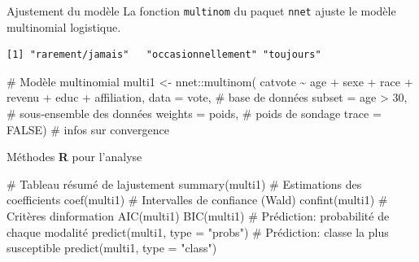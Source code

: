 \documentclass[
  ignorenonframetext,
]{beamer}
\newenvironment{Shaded}{\begin{snugshade}}{\end{snugshade}}
\newcommand{\AttributeTok}[1]{\textcolor[rgb]{0.40,0.45,0.13}{#1}}
\newcommand{\CommentTok}[1]{\textcolor[rgb]{0.37,0.37,0.37}{#1}}
\newcommand{\ConstantTok}[1]{\textcolor[rgb]{0.56,0.35,0.01}{#1}}
\newcommand{\DecValTok}[1]{\textcolor[rgb]{0.68,0.00,0.00}{#1}}
\newcommand{\FunctionTok}[1]{\textcolor[rgb]{0.28,0.35,0.67}{#1}}
\newcommand{\NormalTok}[1]{\textcolor[rgb]{0.00,0.23,0.31}{#1}}
\newcommand{\OtherTok}[1]{\textcolor[rgb]{0.00,0.23,0.31}{#1}}
\newcommand{\SpecialCharTok}[1]{\textcolor[rgb]{0.37,0.37,0.37}{#1}}
\newcommand{\StringTok}[1]{\textcolor[rgb]{0.13,0.47,0.30}{#1}}
\begin{document}
\begin{frame}[fragile]{Ajustement du modèle}
\protect\hypertarget{ajustement-du-moduxe8le}{}
La fonction \texttt{multinom} du paquet \texttt{nnet} ajuste le modèle
multinomial logistique.

\begin{Shaded}
\end{Shaded}

\begin{verbatim}
[1] "rarement/jamais"   "occasionnellement" "toujours"         
\end{verbatim}

\begin{Shaded}
\begin{Highlighting}[numbers=left,,]
\CommentTok{\# Modèle multinomial}
\NormalTok{multi1 }\OtherTok{\textless{}{-}}\NormalTok{ nnet}\SpecialCharTok{::}\FunctionTok{multinom}\NormalTok{(}
\NormalTok{  catvote }\SpecialCharTok{\textasciitilde{}}\NormalTok{ age }\SpecialCharTok{+}\NormalTok{ sexe }\SpecialCharTok{+}\NormalTok{ race }\SpecialCharTok{+}\NormalTok{ revenu }\SpecialCharTok{+} 
\NormalTok{    educ }\SpecialCharTok{+}\NormalTok{ affiliation, }
  \AttributeTok{data =}\NormalTok{ vote,       }\CommentTok{\# base de données}
  \AttributeTok{subset =}\NormalTok{ age }\SpecialCharTok{\textgreater{}} \DecValTok{30}\NormalTok{, }\CommentTok{\# sous{-}ensemble des données}
  \AttributeTok{weights =}\NormalTok{ poids,   }\CommentTok{\# poids de sondage}
  \AttributeTok{trace =} \ConstantTok{FALSE}\NormalTok{)     }\CommentTok{\# infos sur convergence}
\end{Highlighting}
\end{Shaded}
\end{frame}

\begin{frame}[fragile]{Méthodes \textbf{R} pour l'analyse}
\protect\hypertarget{muxe9thodes-r-pour-lanalyse}{}
\begin{Shaded}
\begin{Highlighting}[numbers=left,,]
\CommentTok{\# Tableau résumé de l\textquotesingle{}ajustement}
\FunctionTok{summary}\NormalTok{(multi1)}
\CommentTok{\# Estimations des coefficients}
\FunctionTok{coef}\NormalTok{(multi1)}
\CommentTok{\# Intervalles de confiance (Wald)}
\FunctionTok{confint}\NormalTok{(multi1)}
\CommentTok{\# Critères d\textquotesingle{}information}
\FunctionTok{AIC}\NormalTok{(multi1)}
\FunctionTok{BIC}\NormalTok{(multi1)}
\CommentTok{\# Prédiction: probabilité de chaque modalité}
\FunctionTok{predict}\NormalTok{(multi1, }\AttributeTok{type =} \StringTok{"probs"}\NormalTok{)}
\CommentTok{\# Prédiction: classe la plus susceptible}
\FunctionTok{predict}\NormalTok{(multi1, }\AttributeTok{type =} \StringTok{"class"}\NormalTok{)}
\end{Highlighting}
\end{Shaded}
\end{frame}
\end{document}
